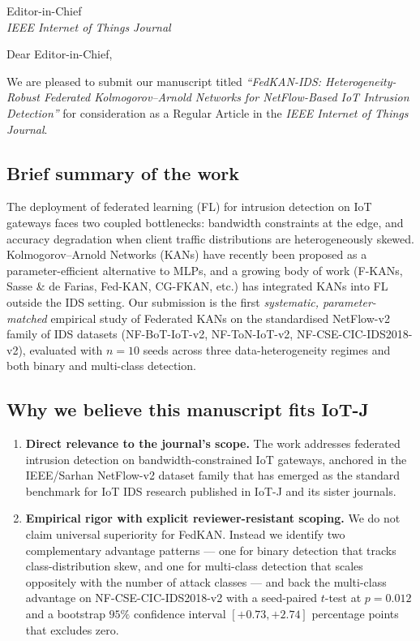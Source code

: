 \documentclass[11pt,a4paper]{letter}
\begin{document}
\begin{letter}{%
    Editor-in-Chief\\
    \emph{IEEE Internet of Things Journal}%
}

\opening{Dear Editor-in-Chief,}

We are pleased to submit our manuscript titled \textit{``FedKAN-IDS: Heterogeneity-Robust Federated Kolmogorov--Arnold Networks for NetFlow-Based IoT Intrusion Detection''} for consideration as a Regular Article in the \emph{IEEE Internet of Things Journal}.

\subsection*{Brief summary of the work}

The deployment of federated learning (FL) for intrusion detection on IoT gateways faces two coupled bottlenecks: bandwidth constraints at the edge, and accuracy degradation when client traffic distributions are heterogeneously skewed. Kolmogorov--Arnold Networks (KANs) have recently been proposed as a parameter-efficient alternative to MLPs, and a growing body of work (F-KANs, Sasse \& de Farias, Fed-KAN, CG-FKAN, etc.) has integrated KANs into FL outside the IDS setting. Our submission is the first \emph{systematic, parameter-matched} empirical study of Federated KANs on the standardised NetFlow-v2 family of IDS datasets (NF-BoT-IoT-v2, NF-ToN-IoT-v2, NF-CSE-CIC-IDS2018-v2), evaluated with $n = 10$ seeds across three data-heterogeneity regimes and both binary and multi-class detection.

\subsection*{Why we believe this manuscript fits IoT-J}

\begin{enumerate}
    \item \textbf{Direct relevance to the journal's scope.} The work addresses federated intrusion detection on bandwidth-constrained IoT gateways, anchored in the IEEE/Sarhan NetFlow-v2 dataset family that has emerged as the standard benchmark for IoT IDS research published in IoT-J and its sister journals.

    \item \textbf{Empirical rigor with explicit reviewer-resistant scoping.} We do not claim universal superiority for FedKAN. Instead we identify two complementary advantage patterns --- one for binary detection that tracks class-distribution skew, and one for multi-class detection that scales oppositely with the number of attack classes --- and back the multi-class advantage on NF-CSE-CIC-IDS2018-v2 with a seed-paired $t$-test at $p = 0.012$ and a bootstrap $95\%$ confidence interval $[+0.73, +2.74]$ percentage points that excludes zero.


\end{enumerate}
\end{letter}
\end{document}
